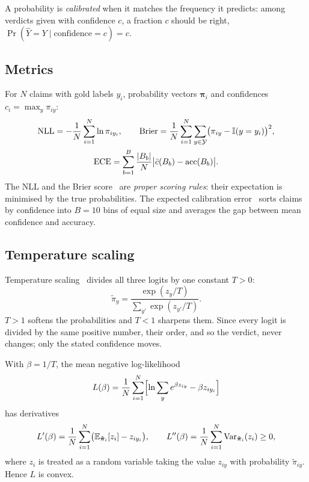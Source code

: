 A probability is \emph{calibrated} when it matches the frequency it predicts: among verdicts given with confidence $c$, a fraction $c$ should be right, $\Pr(\hat{Y} = Y \mid \text{confidence} = c) = c$.

\subsection{Metrics}

For $N$ claims with gold labels $y_i$, probability vectors $\bm{\pi}_i$ and confidences $c_i = \max_y \pi_{iy}$:
\begin{gather}
  \text{NLL} = -\frac{1}{N}\sum_{i=1}^{N} \ln \pi_{i y_i}, \qquad
  \text{Brier} = \frac{1}{N}\sum_{i=1}^{N}\sum_{y \in \mathcal{Y}}\bigl(\pi_{iy} - \mathbb{I}(y = y_i)\bigr)^2, \\
  \text{ECE} = \sum_{b=1}^{B} \frac{\lvert B_b \rvert}{N} \bigl\lvert \bar{c}(B_b) - \text{acc}(B_b) \bigr\rvert .
\end{gather}
The NLL and the Brier score~\citep{brier1950verification} are \emph{proper scoring rules}: their expectation is minimised by the true probabilities. The expected calibration error~\citep{naeini2015obtaining} sorts claims by confidence into $B = 10$ bins of equal size and averages the gap between mean confidence and accuracy.

\subsection{Temperature scaling}

Temperature scaling~\citep{guo2017calibration} divides all three logits by one constant $T > 0$:
\begin{equation}
  \tilde{\pi}_y = \frac{\exp(z_y / T)}{\sum_{y'} \exp(z_{y'}/T)} .
\end{equation}
$T > 1$ softens the probabilities and $T < 1$ sharpens them. Since every logit is divided by the same positive number, their order, and so the verdict, never changes; only the stated confidence moves.

\begin{proposition}
With $\beta = 1/T$, the mean negative log-likelihood
\begin{equation}
  L(\beta) = \frac{1}{N}\sum_{i=1}^{N}\Bigl[ \ln \sum_{y} e^{\beta z_{iy}} - \beta z_{i y_i} \Bigr]
\end{equation}
has derivatives
\begin{equation}
  L'(\beta) = \frac{1}{N}\sum_{i=1}^{N}\bigl( \mathbb{E}_{\tilde{\bm{\pi}}_i}[z_i] - z_{i y_i} \bigr), \qquad
  L''(\beta) = \frac{1}{N}\sum_{i=1}^{N} \operatorname{Var}_{\tilde{\bm{\pi}}_i}(z_i) \ge 0,
\end{equation}
where $z_i$ is treated as a random variable taking the value $z_{iy}$ with probability $\tilde{\pi}_{iy}$. Hence $L$ is convex.
\end{proposition}

